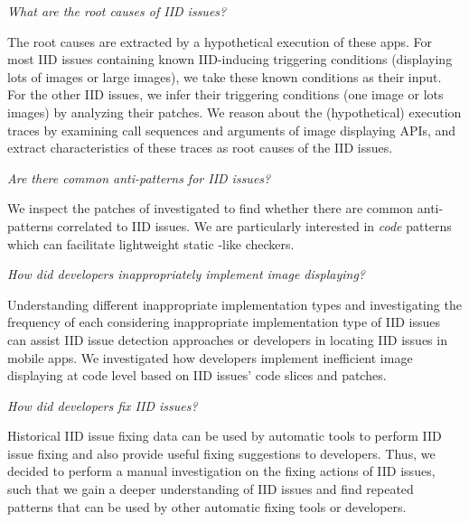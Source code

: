  \emph{What are the root causes of IID issues?}

The root causes are extracted by a hypothetical execution of these apps. For most IID issues containing known IID-inducing triggering conditions (displaying lots of images or large images), we take these known conditions as their input. For the other IID issues, we infer their triggering conditions (one image or lots images) by analyzing their patches.
We reason about the (hypothetical) execution traces by examining call sequences and arguments of image displaying APIs,
and extract characteristics of these traces as root causes of the IID issues.

 \emph{Are there common anti-patterns for IID issues?}

We inspect the patches of investigated to find whether there are common anti-patterns correlated to IID issues.
We are particularly interested in \emph{code} patterns which can facilitate lightweight static -like checkers.

 \emph{How did developers inappropriately implement image displaying?}

Understanding different inappropriate implementation types and investigating the frequency of each considering inappropriate implementation type of IID issues can assist IID issue detection approaches or developers in locating IID issues in mobile apps. We investigated how developers implement inefficient image displaying at code level based on IID issues' code slices and patches.

 \emph{How did developers fix IID issues?}

Historical IID issue fixing data can be used by automatic tools to perform IID issue fixing and also provide useful fixing suggestions to developers. Thus, we decided to perform a manual investigation on the fixing actions of IID issues, such that we gain a deeper understanding of IID issues and find repeated patterns that can be used by other automatic fixing tools or developers.




